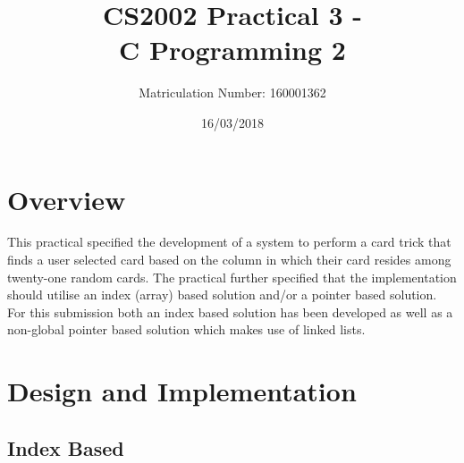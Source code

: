 \documentclass[11]{article}
\title{CS2002 Practical 3 - \\C Programming 2}
\date{16/03/2018}
\author{Matriculation Number: 160001362}
\begin{document}
	\maketitle
	\newpage
	\tableofcontents
	
	\newpage
	\section{Overview}
	This practical specified the development of a system to perform a card trick that finds a user selected card based on the column in which their card resides among twenty-one random cards. The practical further specified that the implementation should utilise an index (array) based solution and/or a pointer based solution. For this submission both an index based solution has been developed as well as a non-global pointer based solution which makes use of linked lists.
	\section{Design and Implementation}
		\subsection{Index Based}
\end{document}
